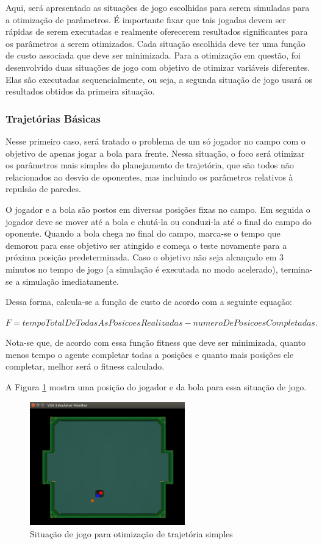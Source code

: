 \documentclass[a4paper,12pt]{article}
\begin{document}
Aqui, será apresentado as situações de jogo escolhidas para serem simuladas para a otimização de parâmetros. É importante fixar que tais jogadas devem ser rápidas de serem executadas e realmente oferecerem resultados significantes para os parâmetros a serem otimizados. Cada situação escolhida deve ter uma função de custo associada que deve ser minimizada.
Para a otimização em questão, foi desenvolvido duas situações de jogo com objetivo de otimizar variáveis diferentes. Elas são executadas sequencialmente, ou seja, a segunda situação de jogo usará os resultados obtidos da primeira situação.

\subsubsection{Trajetórias Básicas}

Nesse primeiro caso, será tratado o problema de um só jogador no campo com o objetivo de apenas jogar a bola para frente. Nessa situação, o foco será otimizar os parâmetros mais simples do planejamento de trajetória, que são todos não relacionados ao desvio de oponentes, mas incluindo os parâmetros relativos à repulsão de paredes.

O jogador e a bola são postos em diversas posições fixas no campo. Em seguida o jogador deve se mover até a bola e chutá-la ou conduzi-la até o final do campo do oponente. Quando a bola chega no final do campo, marca-se o tempo que demorou para esse objetivo ser atingido e começa o teste novamente para a próxima posição predeterminada. Caso o objetivo não seja alcançado em 3 minutos no tempo de jogo (a simulação é executada no modo acelerado), termina-se a simulação imediatamente.

Dessa forma, calcula-se a função de custo de acordo com a seguinte equação:

$ F = tempoTotalDeTodasAsPosicoesRealizadas - numeroDePosicoesCompletadas. $
 
Nota-se que, de acordo com essa função fitness que deve ser minimizada, quanto menos tempo o agente completar todas a posições e quanto mais posições ele completar, melhor será o fitness calculado.

A Figura \ref{fig:sem_obstaculo_simulacao} mostra uma posição do jogador e da bola para essa situação de jogo.

\begin{figure}[H]
	\centering
	\includegraphics[width=0.6\textwidth]{figures/OtimizacaoSemObstaculoSimulacao.png}
	\caption{Situação de jogo para otimização de trajetória simples}
	\label{fig:sem_obstaculo_simulacao}
\end{figure}
\end{document}
